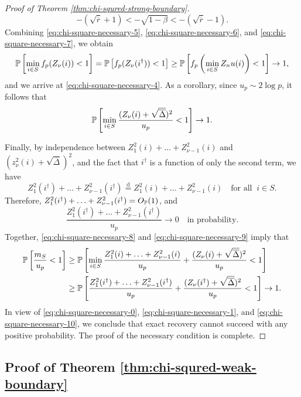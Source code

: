 \begin{proof}[Proof of Theorem \ref{thm:chi-squred-strong-boundary}]
\begin{equation}
    -(\sqrt{\overline{r}}+1) < - \sqrt{1-\beta} < - (\sqrt{\overline{r}}-1).
\end{equation}
Combining \eqref{eq:chi-square-necessary-5}, \eqref{eq:chi-square-necessary-6}, and \eqref{eq:chi-square-necessary-7}, we obtain
$$
\P\left[\min_{i\in S} f_p(Z_\nu(i)) < 1\right]
= \P\left[ f_p(Z_\nu(i^\dagger)) < 1 \right] 
\ge \P\left[ f_p\left(\min_{i\in S}Z_nu(i)\right) < 1 \right] \to 1,
$$
and we arrive at \eqref{eq:chi-square-necessary-4}.
As a corollary, since $u_p\sim2\log{p}$, it follows that
\begin{equation} \label{eq:chi-square-necessary-8}
    \P\left[\min_{i\in S}\frac{(Z_\nu(i) + \sqrt{\overline{\Delta}})^2}{u_p} < 1\right]\to1.
\end{equation}

Finally, by independence between $Z_1^2(i)+\ldots+Z_{\nu-1}^2(i)$ and $(z_\nu^2(i)+\sqrt{\overline{\Delta}})^2$, and the fact that $i^\dagger$ is a function of only the second term, we have
$$
Z_1^2(i^\dagger)+\ldots+Z_{\nu-1}^2(i^\dagger) 
\stackrel{\mathrm{d}}{=} Z_1^2(i)+\ldots+Z_{\nu-1}^2(i) 
\quad \text{for all} \;\; i\in S.
$$
Therefore, $Z_1^2(i^\dagger)+\ldots+Z_{\nu-1}^2(i^\dagger) = O_\P(1)$, and 
\begin{equation} \label{eq:chi-square-necessary-9}
    \frac{Z_1^2(i^\dagger)+\ldots+Z_{\nu-1}^2(i^\dagger)}{u_p} \to 0 \quad \text{in probability}. 
\end{equation}
Together, \eqref{eq:chi-square-necessary-8} and \eqref{eq:chi-square-necessary-9} imply that
\begin{align}
    \P\left[\frac{m_S}{u_p}<1\right]
    &\ge \P\left[\min_{i\in S}\frac{Z_1^2(i) + \ldots + Z_{\nu-1}^2(i)}{u_p} + \frac{(Z_\nu(i) + \sqrt{\overline{\Delta}})^2}{u_p} < 1\right] \nonumber \\
    &\ge \P\left[\frac{Z_1^2(i^\dagger) + \ldots + Z_{\nu-1}^2(i^\dagger)}{u_p} + \frac{(Z_\nu(i^\dagger) + \sqrt{\overline{\Delta}})^2}{u_p} < 1\right] \to 1. \label{eq:chi-square-necessary-10}
\end{align}
In view of \eqref{eq:chi-square-necessary-0}, \eqref{eq:chi-square-necessary-1}, and \eqref{eq:chi-square-necessary-10}, we conclude that exact recovery cannot succeed with any positive probability.
The proof of the necessary condition is complete.
\end{proof}

\subsection{Proof of Theorem \ref{thm:chi-squred-weak-boundary}}
\label{subsec:proof-chi-squred-weak-boundary}

